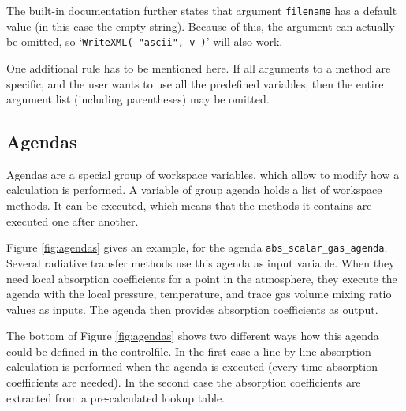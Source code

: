The built-in documentation further states that argument \texttt{filename} has a
default value (in this case the empty string). Because of this, the argument
can actually be omitted, so `\texttt{WriteXML( "ascii", v )}' will also work.

One additional rule has to be mentioned here. If all arguments to a
method are specific, and the user wants to use all the predefined
variables, then the entire argument list (including parentheses) may
be omitted. 


\subsection{Agendas}
\label{sec:agendas}
%
Agendas are a special group of workspace variables, which allow to modify how a
calculation is performed. A variable of group agenda holds a list of workspace
methods. It can be executed, which means that the methods it contains are
executed one after another.

Figure \ref{fig:agendas} gives an example, for the agenda
\texttt{abs\_scalar\_gas\_agenda}. Several radiative transfer methods use this
agenda as input variable. When they need local absorption coefficients for a
point in the atmosphere, they execute the agenda with the local pressure,
temperature, and trace gas volume mixing ratio values as inputs. The agenda
then provides absorption coefficients as output.

The bottom of Figure \ref{fig:agendas} shows two different ways how this agenda
could be defined in the controlfile. In the first case a line-by-line
absorption calculation is performed when the agenda is executed (every time
absorption coefficients are needed). In the second case the absorption
coefficients are extracted from a pre-calculated lookup table.






